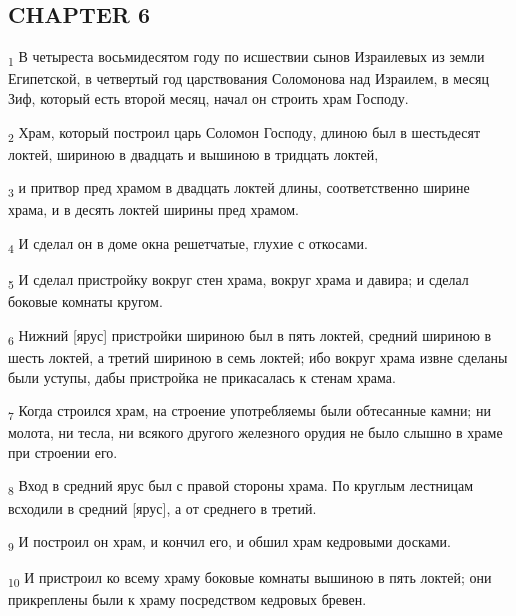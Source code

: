 \subsection{CHAPTER 6}
\begin{tcolorbox}
\textsubscript{1} В четыреста восьмидесятом году по исшествии сынов Израилевых из земли Египетской, в четвертый год царствования Соломонова над Израилем, в месяц Зиф, который есть второй месяц, начал он строить храм Господу.
\end{tcolorbox}
\begin{tcolorbox}
\textsubscript{2} Храм, который построил царь Соломон Господу, длиною был в шестьдесят локтей, шириною в двадцать и вышиною в тридцать локтей,
\end{tcolorbox}
\begin{tcolorbox}
\textsubscript{3} и притвор пред храмом в двадцать локтей длины, соответственно ширине храма, и в десять локтей ширины пред храмом.
\end{tcolorbox}
\begin{tcolorbox}
\textsubscript{4} И сделал он в доме окна решетчатые, глухие с откосами.
\end{tcolorbox}
\begin{tcolorbox}
\textsubscript{5} И сделал пристройку вокруг стен храма, вокруг храма и давира; и сделал боковые комнаты кругом.
\end{tcolorbox}
\begin{tcolorbox}
\textsubscript{6} Нижний [ярус] пристройки шириною был в пять локтей, средний шириною в шесть локтей, а третий шириною в семь локтей; ибо вокруг храма извне сделаны были уступы, дабы пристройка не прикасалась к стенам храма.
\end{tcolorbox}
\begin{tcolorbox}
\textsubscript{7} Когда строился храм, на строение употребляемы были обтесанные камни; ни молота, ни тесла, ни всякого другого железного орудия не было слышно в храме при строении его.
\end{tcolorbox}
\begin{tcolorbox}
\textsubscript{8} Вход в средний ярус был с правой стороны храма. По круглым лестницам всходили в средний [ярус], а от среднего в третий.
\end{tcolorbox}
\begin{tcolorbox}
\textsubscript{9} И построил он храм, и кончил его, и обшил храм кедровыми досками.
\end{tcolorbox}
\begin{tcolorbox}
\textsubscript{10} И пристроил ко всему храму боковые комнаты вышиною в пять локтей; они прикреплены были к храму посредством кедровых бревен.
\end{tcolorbox}
